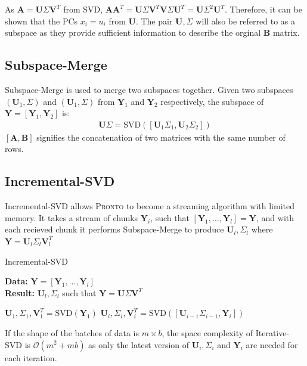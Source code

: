 As $\mathbf{A} = \mathbf{U}\Sigma\mathbf{V}^T$ from SVD,
$\mathbf{AA}^T = \mathbf{U}\Sigma\mathbf{V}^T\mathbf{V}\Sigma\mathbf{U}^T =
\mathbf{U}\Sigma^2\mathbf{U}^T$. Therefore, it can be shown that the PCs
$x_i = u_i$ from $\mathbf{U}$. The pair $\mathbf{U}, \Sigma$ will also be
referred to as a subspace as they provide sufficient information to describe the
orginal $\mathbf{B}$ matrix.

\subsection{Subspace-Merge}
Subspace-Merge is used to merge two subspaces together. Given two subspaces
$(\mathbf{U}_1, \Sigma)$ and $(\mathbf{U}_1, \Sigma)$ from $\mathbf{Y}_1$ and
$\mathbf{Y}_2$ respectively, the subspace of $\mathbf{Y} = [\mathbf{Y}_1,
\mathbf{Y}_2]$ is:
\begin{align}
    \mathbf{U}\Sigma = \text{SVD}([\mathbf{U}_1\Sigma_1, \mathbf{U}_2\Sigma_2])
\end{align}
$[\mathbf{A}, \mathbf{B}]$ signifies the concatenation of two matrices with the
same number of rows.

\subsection{Incremental-SVD}
Incremental-SVD allows \textsc{Pronto} to become a streaming algorithm with limited
memory. It takes a stream of chunks $\mathbf{Y}_i$, such that  $[\mathbf{Y}_1,
\ldots, \mathbf{Y}_l] = \mathbf{Y}$, and with each recieved chunk it performs
Subspace-Merge to produce $\mathbf{U}_l, \Sigma_l$ where $\mathbf{Y} =
\mathbf{U}_l\Sigma_l\mathbf{V}_l^T$

\begin{algorithm}
\caption{Incremental-SVD}
\textbf{Data:} $\mathbf{Y} = [\mathbf{Y}_1, \dots, \mathbf{Y}_l]$ \\
    \textbf{Result:} $\mathbf{U}_l, \Sigma_l$ such that $\mathbf{Y} =
    \mathbf{U}\Sigma\mathbf{V}^T$
\begin{algorithmic}
\State $\mathbf{U}_1, \Sigma_1, \mathbf{V}_1^T = \text{SVD}(\mathbf{Y}_1)$
\State $\mathbf{U}_i, \Sigma_i, \mathbf{V}_i^T = \text{SVD}([\mathbf{U}_{i-1}\Sigma_{i-1}, \mathbf{Y}_i])$
\EndFor
\end{algorithmic}
\end{algorithm}
If the shape of the batches of data is $m \times b$, the space complexity of
Iterative-SVD is $\mathcal{O}(m^2 + mb)$ as only the latest version of
$\mathbf{U}_i,\Sigma_i$ and $\mathbf{Y}_i$ are needed for each iteration.

